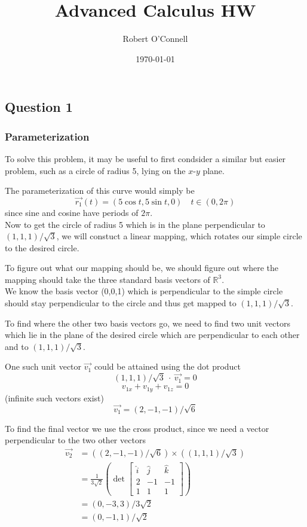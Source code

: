 \documentclass{article}
\title{\textbf{Advanced Calculus HW}}
\author{Robert O'Connell}
\date{\today}
\begin{document}
\maketitle
\vspace{5mm}

\subsection*{Question 1}
\subsubsection*{Parameterization}

To solve this problem, it may be useful to first condsider a similar but easier problem, such as a circle of radius 5, lying on 
the \(x\)-\(y\) plane.

The parameterization of this curve would simply be
\[
\vec{r_1}(t) = (5\cos t, 5 \sin t, 0) \quad t \in (0,2\pi)
\]
since sine and cosine have periods of \(2\pi\).
\\

Now to get the circle of radius 5 which is in the plane perpendicular to \((1,1,1)/\sqrt{3}\), we will constuct a linear mapping, which 
rotates our simple circle to the desired circle.

To figure out what our mapping should be, we should figure out where the mapping should take the three standard basis vectors of \(\mathbb{R}^3\).
\\

We know the basis vector (0,0,1) which is perpendicular to the simple circle should stay perpendicular to the circle and thus get mapped to 
\((1,1,1)/\sqrt{3}\). 

To find where the other two basis vectors go, we need to find two unit vectors which lie in the plane of the desired circle which are 
perpendicular to each other and to \((1,1,1)/\sqrt{3}\).

One such unit vector \(\vec{v_1}\) could be attained using the dot product
\[
(1,1,1)/\sqrt{3} \ \cdot \ \vec{v_1} = 0
\]
\[
v_{1x} + v_{1y} + v_{1z} = 0
\]
(infinite such vectors exist)
\[
\vec{v_1} = (2,-1,-1)/\sqrt{6}
\]

To find the final vector we use the cross product, since we need a vector perpendicular to the two other vectors
\begin{align*}
    \vec{v_2} &= ((2,-1,-1)/\sqrt{6}) \times ((1,1,1)/\sqrt{3}) \\
    &= \frac{1}{3\sqrt{2}}(\det \begin{bmatrix}
        \hat{i} & \hat{j} & \hat{k} \\
        2 & -1 & -1 \\
        1 & 1 & 1 
    \end{bmatrix}) \\
    &= (0, -3, 3)/3\sqrt{2} \\
    &= (0,-1,1)/\sqrt{2}
\end{align*}
\\
\end{document}
